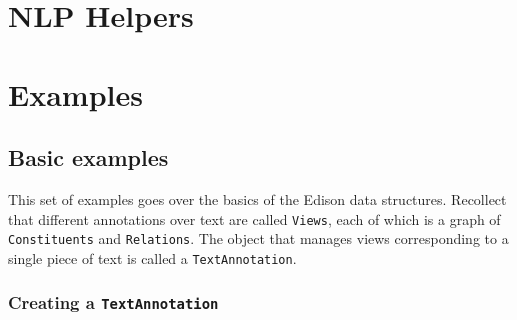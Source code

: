 \documentclass[11pt]{article}
\begin{document}
  
\section{NLP Helpers}
\label{sec-5}
\section{Examples}
\label{sec-6}
\subsection{Basic examples}
\label{sec-6-1}


   This set of examples goes over the basics of the Edison data
   structures. Recollect that different annotations over text are
   called \texttt{Views}, each of which is a graph of \texttt{Constituents} and
   \texttt{Relations}. The object that manages views corresponding to a
   single piece of text is called a \texttt{TextAnnotation}.
\subsubsection{Creating a \texttt{TextAnnotation}}
\label{sec-6-1-1}
\end{document}
